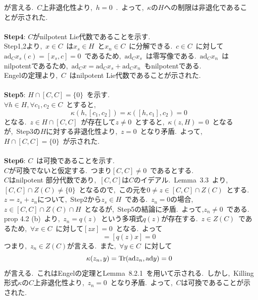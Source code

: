 \documentclass[uplatex,dvipdfmx]{jsarticle}
\begin{document}
\begin{myproof}
    が言える.~$C$上非退化性より,~$h=0$~.~よって,~$\kappa$の$H$への制限は非退化であることが示された.\\\\
    \textbf{Step4}:
    $C$がnilpotent Lie代数であることを示す.\\
    Step1,2より,~$x\in C$~は$x_s \in H$~と$x_n \in C$~に分解できる.~$c \in C$~に対して$\text{ad}_C x_s (c) = [x_s,c] = 0$~であるため,~$\text{ad}_C x_s$~は零写像である.~$\text{ad}_C x_n$~はnilpotentであるため,~$\text{ad}_C x = \text{ad}_C x_s + \text{ad}_C x_n$~もnilpotentである.\\
    Engelの定理より,~$C$~はnilpotent Lie代数であることが示された.\\\\
    \textbf{Step5}:
    $H \cap [C,C] = \{0\}$~を示す.\\
    $\forall h \in H, \forall c_1,c_2 \in C$~とすると,~
    \begin{equation*}
        \kappa(h,[c_1,c_2]) = \kappa([h,c_1],c_2) = 0
    \end{equation*}
    となる.~$z \in H \cap [C,C]$~が存在して$z\neq 0$~とすると,~$\kappa(z,H) = 0$~となるが,~Step3の$H$に対する非退化性より,~$z=0$~となり矛盾.~よって,~$H \cap [C,C] = \{0\}$~が示された.\\\\
    \textbf{Step6}:
    $C$~は可換であることを示す.\\
    $C$が可換でないと仮定する.~つまり$[C,C]\neq 0$~であるとする.\\
    $C$はnilpotent 部分代数であり,~$[C,C]$は$C$のイデアル.~Lemma~3.3~より,~$[C,C] \cap Z(C) \neq \{0\}$~となるので,~この元を$0 \neq z \in [C,C] \cap Z(C)$~とする.\\
    $z = z_s +z_n$について,~Step2から$z_s \in H$~である.~$z_n = 0$の場合,~$z \in [C,C]\cap Z(C) \cap H$~となるが,~Step5の結論に矛盾.~よって,$z_n \neq 0$~である.~\\
    prop 4.2 (b)~より,~$z_n = q(z)$~という多項式$q(z)$が存在する.~$z\in Z(C)$~であるため,~$\forall x \in C$~に対して$[zx] = 0$~となる.~よって
    \begin{equation*}
        [z_n x] = [q(z)x] = 0
    \end{equation*}
    つまり,~$z_n \in Z(C)$が言える.~また,~$\forall y\in C$~に対して
    \begin{equation*}
        \kappa(z_n,y) = \Tr(\text{ad}z_n, \text{ad}y) = 0
    \end{equation*}
    が言える.~これはEngelの定理とLemma~8.2.1~を用いて示される.~しかし,~Killing形式$\kappa$の$C$上非退化性より,~$z_n = 0$~となり矛盾.~よって,~$C$は可換であることが示された.\\\\

\end{myproof}
\end{document}
